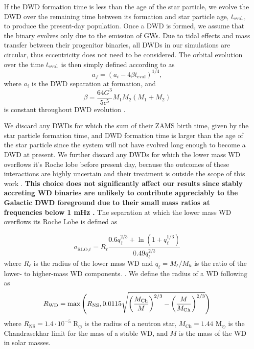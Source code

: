 \documentclass[twocolumn, linenumbers]{aastex631}
\begin{document}
If the DWD formation time is less than the age of the star particle, we evolve the DWD over the remaining time between its formation and star particle age, $t_{\rm{evol}}$, to produce the present-day population. Once a DWD is formed, we assume that the binary evolves only due to the emission of GWs. Due to tidal effects and mass transfer between their progenitor binaries, all DWDs in our simulations are circular, thus eccentricity does not need to be considered. The orbital evolution over the time $t_{\rm{evol}}$ is then simply defined according to \citet{Peters1964} as
\begin{equation}
    a_f = (a_i - 4\beta t_\text{evol})^{1/4},
\end{equation}
where $a_i$ is the DWD separation at formation, and 
\begin{equation}
    \beta = \frac{64G^3}{5c^5} M_1M_2(M_1+M_2)
\end{equation}
is constant throughout DWD evolution \citep{Peters1964}.

We discard any DWDs for which the sum of their ZAMS birth time, given by the star particle formation time, and DWD formation time is larger than the age of the star particle since the system will not have evolved long enough to become a DWD at present. We further discard any DWDs for which the lower mass WD overflows it's Roche lobe before present day, because the outcomes of these interactions are highly uncertain and their treatment is outside the scope of this work \citep[e.g., ][]{Shen2015, Kremer2017}. \textbf{This choice does not significantly affect our results since stably accreting WD binaries are unlikely to contribute appreciably to the Galactic DWD foreground due to their small mass ratios at frequencies below 1 mHz \citep{Breivik2018}.} The separation at which the lower mass WD overflows its Roche Lobe is defined as

\begin{equation}
    a_{\text{RLO,}\ell} = R_{\ell} \frac{0.6 q_{\ell}^{2/3} + \ln{(1+q_{\ell}^{1/3})}}{0.49 q_{\ell}^{2/3}}
\end{equation}
where $R_{\ell}$ is the radius of the lower mass WD and $q_{\ell} = M_{\ell}/M_{h}$ is the ratio of the lower- to higher-mass WD components. \citep{Eggleton1983}. 
We define the radius of a WD following \citet{Tout1997, Hurley2000} as
\begin{equation}
    R_{\rm{WD}} = \max\Bigg(R_\text{NS}, 0.0115\sqrt{\left(\frac{M_\text{Ch}}{M}\right)^{2/3}-\left(\frac{M}{M_\text{Ch}}\right)^{2/3}} \Bigg) 
\end{equation}
\noindent where $R_\text{NS} = 1.4\cdot 10^{-5}$ R$_\odot$ is the radius of a neutron star, $M_{\text{Ch}}=1.44$ M$_\odot$ is the Chandrasekhar limit for the mass of a stable WD, and $M$ is the mass of the WD in solar masses. 
\end{document}
